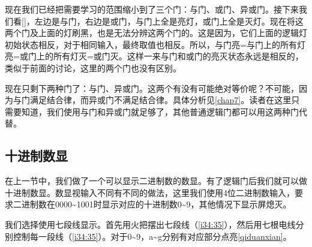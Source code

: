 现在我们已经把需要学习的范围缩小到了三个门：与门、或门、异或门。接下来我们看\autoref{}，左边是与门，右边是或门，与门上全是亮灯，或门上全是灭灯。现在将这两个门及上面的灯刷黑，也是无法分辨这两个门的。这是因为，它们上面的逻辑灯初始状态相反，对于相同输入，最终取值也相反。所以，与门亮=与门上的所有灯亮=或门上的所有灯灭=或门灭。这样一来与门和或门的亮灭状态永远是相反的，类似于前面的讨论，这里的两个门也没有区别。

现在只剩下两种门了：与门、异或门。这两个有没有可能绝对等价呢？不可能，因为与门满足结合律，而异或门不满足结合律。具体分析见\autoref{chap7}。读者在这里只需要知道，我们使用与门和异或门就足够了，其他普通逻辑门都可以用这两种门代替。

\subsection{十进制数显}\label{sec2:2}

在上一节中，我们做了一个可以显示二进制数的数显。有了逻辑门后我们就可以做十进制数显。数显视输入不同有不同的做法，这里我们使用4位二进制数输入，要求二进制数在0000\~{}1001时显示对应的十进制数0\~{}9，其他情况下显示屏熄灭。

我们选择使用七段线显示。首先用火把摆出七段线（\autoref{i34:35}），然后用七根电线分别控制每一段线（\autoref{i34:35}）。对于0\~{}9，a\~{}g分别有对应部分点亮\autoref{qiduanxian}。

\begin{figure}[!h]
\begin{center}
\quad
{}
\end{center}
\caption{}
\label{i34:35}
\end{figure}

